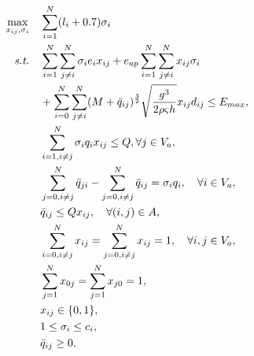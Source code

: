 \documentclass[AutoFakeBold]{LZUThesis}
\begin{document}
\begin{subequations}\label{GRP}
	\begin{align}
		\max_{x_{ij}, \sigma_i} \quad & \sum_{i=1}^{N} (l_i + 0.7) \sigma_i                                                                                                                         \\
		\emph{s.t.} \quad             & \sum^N_{i = 1}\sum^N_{j \neq i}\sigma_i e_i x_{ij} + e_{ap}\sum^N_{i=1}\sum^N_{j \neq i} x_{ij}\sigma_i \nonumber                                           \\
		                              & + \sum^N_{i=0}\sum^N_{j \neq i} (M + \bar{q}_{ij})^{\frac{3}{2}}\sqrt{\frac{g^3}{2 \rho \varsigma h}} x_{ij} d_{ij} \leq E_{max}, \label{energy-constraint} \\
		                              & \sum^N_{i=1, i\neq j} \sigma_i q_i x_{ij} \leq Q, \forall j \in V_a,\label{total-load}                                                                      \\
		                              & \sum^N_{j=0, i\neq j}\bar{q}_{ji} -  \sum^N_{j=0, i\neq j}\bar{q}_{ij} = \sigma_i q_i, \label{carry-load} \quad \forall i \in V_a,                          \\
		                              & \bar{q}_{ij} \leq Q x_{ij}, \quad \forall (i,j) \in A, \label{load}                                                                                         \\
		                              & \sum^N_{i=0, i\neq j} x_{ij} = \sum^N_{j=0,i\neq j} x_{ij} = 1, \quad \forall i,j \in V_a, \label{enter-point}                                              \\
		                              & \sum^N_{j=1} x_{0j} = \sum^N_{j=1} x_{j0} = 1, \label{start-point}                                                                                          \\
		                              & x_{ij} \in \{0,1\}, \label{binary-variable}                                                                                                                 \\
		                              & 1 \leq \sigma_i \leq c_i, \label{area-constraint}                                                                                                           \\
		                              & \bar{q}_{ij} \geq 0. \label{flight-weight}
	\end{align}
\end{subequations}
\end{document}
